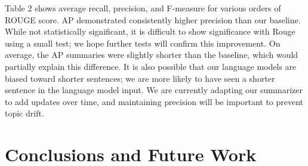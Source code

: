 \documentclass{sig-alternate} \usepackage{url} \usepackage{color}
\newcommand{\fdcomment}[1]{\textbf{\textcolor{red}{[FD: #1]}}}
\begin{document}
Table 2 shows average recall, precision, and F-measure for various orders of
ROUGE score. AP demonstrated consistently higher precision than our baseline.
While not statistically significant, it is difficult to show significance with
Rouge using a small test; we hope further tests will confirm this improvement. 
On average, the AP summaries were slightly shorter than the baseline, which
would partially explain this difference. It is also possible that our language
models are biased toward shorter sentences; we are more likely to have seen a
shorter sentence in the language model input.
We are currently adapting our summarizer to add updates over time, and
maintaining precision will be important to prevent topic drift.  







\section{Conclusions and Future Work}
\end{document}
